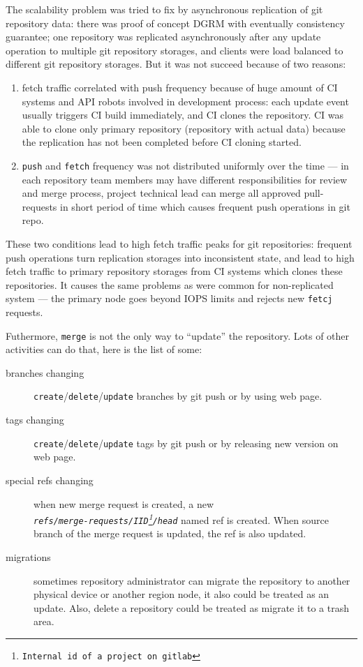 \documentclass[acmlarge, screen, nonacm]{acmart}
\newcommand{\code}[1]{\texttt{#1}}
\begin{document}
The scalability problem was tried to fix by asynchronous replication of git repository data:
there was proof of concept DGRM with eventually consistency guarantee;
one repository was replicated asynchronously after any update operation to multiple git repository storages,
and clients were load balanced to different git repository storages.
But it was not succeed because of two reasons:
\begin{enumerate}
  \item fetch traffic correlated with push frequency because of huge amount of
  CI systems and API robots involved in development process: each update event usually triggers
  CI build immediately, and CI clones the repository. CI was able to clone only
  primary repository (repository with actual data) because the replication has not been completed
  before CI cloning started.
  \item \code{push} and \code{fetch} frequency was not distributed uniformly over the time --- in each
  repository team members may have different responsibilities for review and merge process,
  project technical lead can merge all approved pull-requests in short period of time
  which causes frequent push operations in git repo.
\end{enumerate}

These two conditions lead to high fetch traffic peaks for git repositories:
frequent push operations turn replication storages into inconsistent state,
and lead to high fetch traffic to primary repository storages from CI systems which clones these repositories.
It causes the same problems as were common for non-replicated system --- the primary node goes beyond IOPS limits and
rejects new \code{fetcj} requests.

Futhermore, \code{merge} is not the only way to ``update'' the repository. Lots of other activities can do that,
here is the list of some:

\begin{description}
  \item[branches changing] \verb|create|/\verb|delete|/\verb|update| branches by git push or by using web page.
  \item[tags changing] \verb|create|/\verb|delete|/\verb|update| tags by git push or by releasing new version on web page.
  \item[special refs changing] when new merge request is created, a new\\
    \emph{\code{refs/merge-requests/IID\footnote{Internal id of a project on gitlab}/head}} named ref
    is created. When source branch of the merge request is updated, the ref is also updated.
  \item[migrations] sometimes repository administrator can migrate the repository to
    another physical device or another region node, it also could be treated as an update.
    Also, delete a repository could be treated as migrate it to a trash area.
\end{description}
\end{document}
